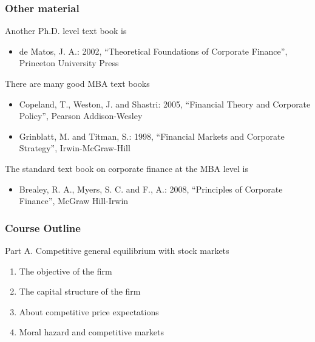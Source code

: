 \documentclass[blue]{beamer}
\theoremstyle{definition}
\theoremstyle{example}
\begin{document}

\begin{frame}\frametitle{Other material}

Another Ph.D. level text book is
\begin{itemize}
\item de Matos, J. A.: 2002, ``Theoretical Foundations of Corporate Finance'', Princeton University Press
\end{itemize}

There are many good MBA text books

\begin{itemize}
\item Copeland, T., Weston, J. and Shastri: 2005, ``Financial Theory and Corporate Policy'', Pearson Addison-Wesley
\item Grinblatt, M. and Titman, S.: 1998, ``Financial Markets and Corporate Strategy'', Irwin-McGraw-Hill
\end{itemize}

The standard text book on corporate finance at the MBA level is
\begin{itemize}
\item Brealey, R. A., Myers, S. C. and F., A.: 2008, ``Principles of Corporate Finance'', McGraw Hill-Irwin
\end{itemize}

\end{frame}



\begin{frame}\frametitle{Course Outline}

\begin{center}
Part A. Competitive general equilibrium with stock markets
\end{center}

    \begin{enumerate}[1.]
    \item The objective of the firm
    \item The capital structure of the firm
    \item About competitive price expectations
    \item Moral hazard and competitive markets
    \end{enumerate}

\end{frame}
\end{document}
